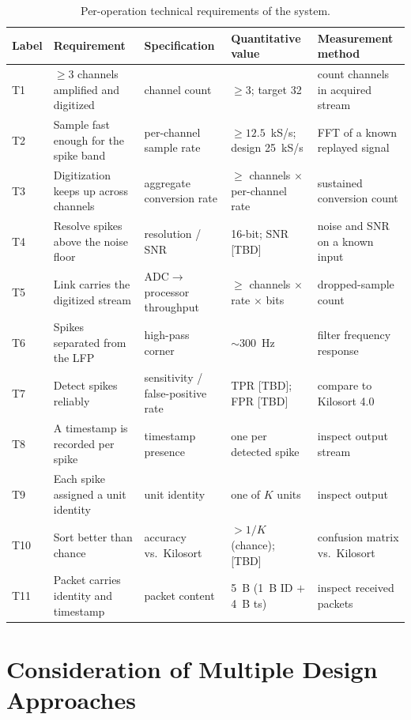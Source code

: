 \documentclass[11pt]{article}
\begin{document}
\begin{table}[H]
\centering
\caption{Per-operation technical requirements of the system.}
\label{tab:techreq}
{\footnotesize
\setlength{\tabcolsep}{4pt}
\renewcommand{\arraystretch}{1.25}
\begin{tabularx}{\textwidth}{@{}l L L L L@{}}
\toprule
Label & Requirement & Specification & Quantitative value & Measurement method \\
\midrule
T1  & $\geq 3$ channels amplified and digitized & channel count & $\geq 3$; target 32 & count channels in acquired stream \\
T2  & Sample fast enough for the spike band & per-channel sample rate & $\geq 12.5$~kS/s; design 25~kS/s & FFT of a known replayed signal \\
T3  & Digitization keeps up across channels & aggregate conversion rate & $\geq$ channels $\times$ per-channel rate & sustained conversion count \\
T4  & Resolve spikes above the noise floor & resolution / SNR & 16-bit; SNR [TBD] & noise and SNR on a known input \\
T5  & Link carries the digitized stream & ADC$\to$processor throughput & $\geq$ channels $\times$ rate $\times$ bits & dropped-sample count \\
T6  & Spikes separated from the LFP & high-pass corner & $\sim$300~Hz & filter frequency response \\
T7  & Detect spikes reliably & sensitivity / false-positive rate & TPR [TBD]; FPR [TBD] & compare to Kilosort 4.0 \\
T8  & A timestamp is recorded per spike & timestamp presence & one per detected spike & inspect output stream \\
T9  & Each spike assigned a unit identity & unit identity & one of $K$ units & inspect output \\
T10 & Sort better than chance & accuracy vs.\ Kilosort & $> 1/K$ (chance); [TBD] & confusion matrix vs.\ Kilosort \\
T11 & Packet carries identity and timestamp & packet content & 5~B (1~B ID $+$ 4~B ts) & inspect received packets \\
\bottomrule
\end{tabularx}
}
\end{table}

\section*{Consideration of Multiple Design Approaches}
\end{document}
